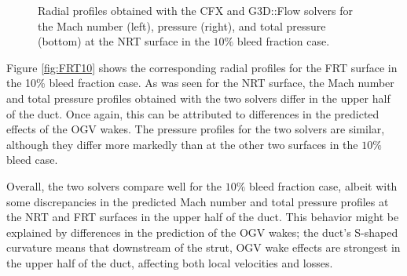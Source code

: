 \begin{figure}[h!]
\begin{minipage}{0.48\columnwidth}
  \end{minipage}
  \caption{Radial profiles obtained with the CFX and G3D::Flow solvers for the Mach number (left), pressure (right), and total pressure (bottom) at the NRT surface in the $10\%$ bleed fraction case.} \label{fig:NRT10}
\end{figure}
Figure \ref{fig:FRT10} shows the corresponding radial profiles for the FRT surface in the 10\% bleed fraction case. As was seen for the NRT surface, the Mach number and total pressure profiles obtained with the two solvers differ in the upper half of the duct. Once again, this can be attributed to differences in the predicted effects of the OGV wakes. The pressure profiles for the two solvers are similar, although they differ more markedly than at the other two surfaces in the $10\%$ bleed case.

Overall, the two solvers compare well for the $10\%$ bleed fraction case, albeit with some discrepancies in the predicted Mach number and total pressure profiles at the NRT and FRT surfaces in the upper half of the duct. This behavior might be explained by differences in the prediction of the OGV wakes; the duct's S-shaped curvature means that downstream of the strut, OGV wake effects are strongest in the upper half of the duct, affecting both local velocities and losses.

